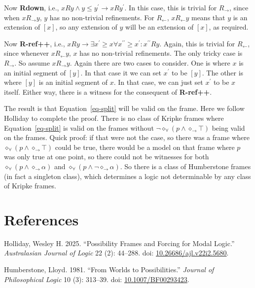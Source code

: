 \documentclass[
  11pt,
  letterpaper,
  DIV=11,
  numbers=noendperiod,
  twoside]{scrartcl}
\newlength{\cslhangindent}
\newenvironment{CSLReferences}[2] %
 {\begin{list}{}{%
  \setlength{\itemindent}{0pt}
  \setlength{\leftmargin}{0pt}
  \setlength{\parsep}{0pt}
  \ifodd #1
   \setlength{\leftmargin}{\cslhangindent}
   \setlength{\itemindent}{-1\cslhangindent}
  \fi
  \setlength{\itemsep}{#2\baselineskip}}}
 {\end{list}}
\begin{document}
Now \textbf{Rdown}, i.e.,
\(xRy \wedge y \leq y^\prime \rightarrow xRy^\prime\). In this case,
this is trivial for \(R_{\rightarrow}\), since when
\(xR_{\rightarrow}y\), \(y\) has no non-trivial refinements. For
\(R_{\leftarrow}\), \(xR_{\leftarrow}y\) means that \(y\) is an
extension of \([x]\), so any extension of \(y\) will be an extension of
\([x]\), as required.

Now \textbf{R-ref++}, i.e.,
\(xRy \rightarrow \exists x^\prime \geq x \forall x^{\prime\prime} \geq x^\prime: x^{\prime\prime}Ry\).
Again, this is trivial for \(R_{\leftarrow}\), since whenever
\(xR_{\leftarrow}y\), \(x\) has no non-trivial refinements. The only
tricky case is \(R_{\rightarrow}\). So assume \(xR_{\rightarrow}y\).
Again there are two cases to consider. One is where \(x\) is an initial
segment of \([y]\). In that case it we can set \(x^\prime\) to be
\([y]\). The other is where \([y]\) is an initial segment of \(x\). In
that case, we can just set \(x^\prime\) to be \(x\) itself. Either way,
there is a witness for the consequent of \textbf{R-ref++}.

The result is that Equation~\ref{eq-split} will be valid on the frame.
Here we follow Holliday to complete the proof. There is no class of
Kripke frames where Equation~\ref{eq-split} is valid on the frames
without
\(\neg \diamond_{\forall}(p \wedge \diamond_{\rightarrow} \top)\) being
valid on the frames. Quick proof: if that were not the case, so there
was a frame where
\(\diamond_{\forall}(p \wedge \diamond_{\rightarrow} \top)\) could be
true, there would be a model on that frame where \(p\) was only true at
one point, so there could not be witnesses for both
\(\diamond_{\forall}(p \wedge \diamond_{\rightarrow} \alpha)\) and
\(\diamond_{\forall}(p \wedge \neg \diamond_{\rightarrow} \alpha)\). So
there is a class of Humberstone frames (in fact a singleton class),
which determines a logic not determinable by any class of Kripke frames.

\section*{References}\label{references}

\protect{}\label{refs}
\begin{CSLReferences}{1}{0}
Holliday, Wesley H. 2025. {``Possibility Frames and Forcing for Modal
Logic.''} \emph{Australasian Journal of Logic} 22 (2): 44--288. doi:
\href{https://doi.org/10.26686/ajl.v22i2.5680}{10.26686/ajl.v22i2.5680}.

Humberstone, Lloyd. 1981. {``From Worlds to Possibilities.''}
\emph{Journal of Philosophical Logic} 10 (3): 313--39. doi:
\href{https://doi.org/10.1007/BF00293423}{10.1007/BF00293423}.

\end{CSLReferences}
\end{document}
